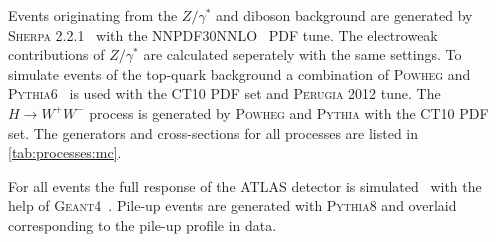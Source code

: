 Events originating from the $Z/\gamma^*$ and diboson background are generated by
\textsc{Sherpa 2.2.1}~\cite{Sherpa,Gleisberg:2008fv,Cascioli:2011va,Schumann:2007mg,Hoeche:2012yf}
with the \textsc{NNPDF30NNLO}~\cite{NNPDF30} PDF tune.
The electroweak contributions of $Z/\gamma^*$ are calculated seperately with the same settings.
To simulate events of the top-quark background a combination of \textsc{Powheg} and \textsc{Pythia6}~\cite{Pythia6}
is used with the \textsc{CT10} PDF set and \textsc{Perugia 2012} tune.
The $H\to W^+W^-$ process is generated by \textsc{Powheg} and \textsc{Pythia} with the \textsc{CT10} PDF set.
The generators and cross-sections for all processes are listed in \cref{tab:processes:mc}.

For all events the full response of the ATLAS detector is simulated~\cite{SOFT-2010-01} with the help of \textsc{Geant4}~\cite{Geant4}.
Pile-up events are generated with \textsc{Pythia8} and overlaid corresponding to the pile-up profile in data.


